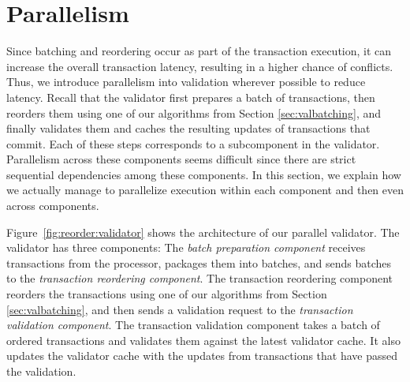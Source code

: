 

\section{Parallelism}
\label{sec:parallel}
\label{sec:validator_reordering:parallel}


Since batching and reordering occur as part of the transaction execution, it can increase the overall transaction latency, 
resulting in a higher chance of conflicts. Thus, we introduce parallelism into validation wherever possible to reduce latency.
Recall that the validator first prepares a batch of transactions, then reorders them using one of our algorithms from Section \ref{sec:valbatching},  
and finally validates them and caches the resulting updates of transactions that commit.
 Each of these steps corresponds to a subcomponent in the validator. Parallelism across these components seems difficult since there are strict sequential dependencies among these components. In this section, we explain how we actually manage to parallelize execution within each component and then even across components.


Figure~\ref{fig:reorder:validator} shows the architecture of our parallel validator. The validator has three components: 
The \emph{batch preparation component} receives transactions from the processor, packages them into batches, and sends batches to the \emph{transaction reordering component}. The transaction reordering component reorders the transactions using one of our algorithms from Section \ref{sec:valbatching}, and then sends a validation request to the \emph{transaction validation component}. The transaction validation component takes a batch of ordered 
transactions
and validates them against the latest validator cache. It also updates the validator cache with the updates from transactions that have passed the validation. 

